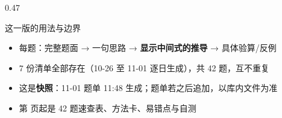 \documentclass[aspectratio=169,10pt,fontset=none]{ctexbeamer}
\begin{document}
\begin{frame}[plain]
\begin{columns}[T,onlytextwidth]
\begin{column}{0.47\textwidth}
\begin{block}{这一版的用法与边界}
        \scriptsize
        \begin{itemize}\setlength{\itemsep}{1pt}
          \item 每题：完整题面 → 一句思路 → \textbf{显示中间式的推导} → 具体验算/反例
          \item 7 份清单全部存在（10-26 至 11-01 逐日生成），共 42 题，互不重复
          \item 这是\textbf{快照}：11-01 题单 11:48 生成；题单若之后追加，以库内文件为准
          \item 第 \pageref{sec:answers} 页起是 42 题速查表、方法卡、易错点与自测
        \end{itemize}
      \end{block}
    \end{column}
  \end{columns}
\end{frame}
\end{document}
